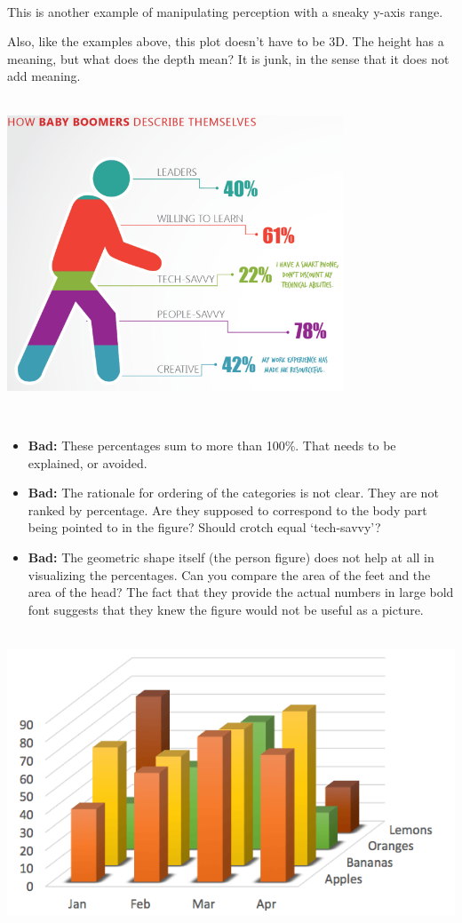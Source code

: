 \documentclass[
]{book}
\begin{document}
~

This is another example of manipulating perception with a sneaky y-axis range.

Also, like the examples above, this plot doesn't have to be 3D. The height has a meaning, but what does the depth mean? It is junk, in the sense that it does not add meaning.

~\\

\includegraphics[width=0.75\textwidth,height=\textheight]{img/vis12.png}

~

\begin{itemize}
\item
  \textbf{Bad:} These percentages sum to more than 100\%. That needs to be explained, or avoided.
\item
  \textbf{Bad:} The rationale for ordering of the categories is not clear. They are not ranked by percentage. Are they supposed to correspond to the body part being pointed to in the figure? Should crotch equal `tech-savvy'?
\item
  \textbf{Bad:} The geometric shape itself (the person figure) does not help at all in visualizing the percentages. Can you compare the area of the feet and the area of the head? The fact that they provide the actual numbers in large bold font suggests that they knew the figure would not be useful as a picture.
\end{itemize}

~\\

\includegraphics{img/vis13.png}
\end{document}
